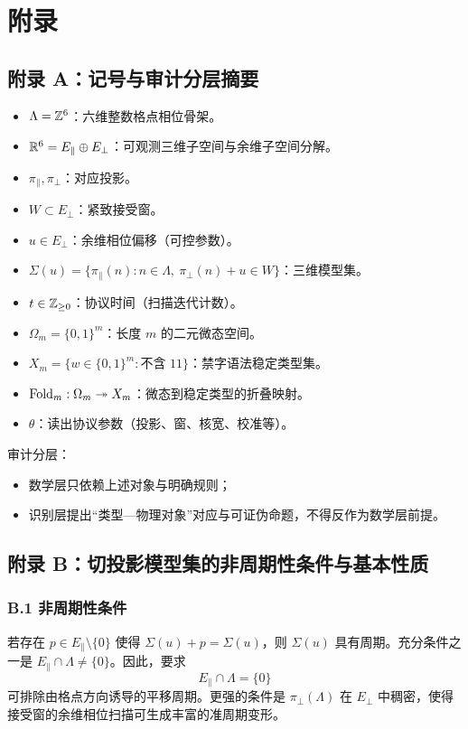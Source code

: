 \section{附录}

\subsection{附录 A：记号与审计分层摘要}

\begin{itemize}
  \item $\Lambda=\mathbb{Z}^6$：六维整数格点相位骨架。
  \item $\mathbb{R}^6=E_{\parallel}\oplus E_{\perp}$：可观测三维子空间与余维子空间分解。
  \item $\pi_{\parallel},\pi_{\perp}$：对应投影。
  \item $W\subset E_{\perp}$：紧致接受窗。
  \item $u\in E_{\perp}$：余维相位偏移（可控参数）。
  \item $\Sigma(u)=\{\pi_{\parallel}(n): n\in\Lambda,\ \pi_{\perp}(n)+u\in W\}$：三维模型集。
  \item $t\in\mathbb{Z}_{\ge 0}$：协议时间（扫描迭代计数）。
  \item $\Omega_m=\{0,1\}^m$：长度 $m$ 的二元微态空间。
  \item $X_m=\{w\in\{0,1\}^m:\text{不含 }11\}$：禁字语法稳定类型集。
  \item $\mathrm{Fold}_m:\Omega_m\twoheadrightarrow X_m$：微态到稳定类型的折叠映射。
  \item $\theta$：读出协议参数（投影、窗、核宽、校准等）。
\end{itemize}

审计分层：
\begin{itemize}
  \item 数学层只依赖上述对象与明确规则；
  \item 识别层提出“类型—物理对象”对应与可证伪命题，不得反作为数学层前提。
\end{itemize}

\subsection{附录 B：切投影模型集的非周期性条件与基本性质}

\subsubsection{B.1 非周期性条件}

若存在 $p\in E_{\parallel}\setminus\{0\}$ 使得 $\Sigma(u)+p=\Sigma(u)$，则 $\Sigma(u)$ 具有周期。充分条件之一是 $E_{\parallel}\cap\Lambda\neq\{0\}$。因此，要求
\[
E_{\parallel}\cap\Lambda=\{0\}
\]
可排除由格点方向诱导的平移周期。更强的条件是 $\pi_{\perp}(\Lambda)$ 在 $E_{\perp}$ 中稠密，使得接受窗的余维相位扫描可生成丰富的准周期变形。

